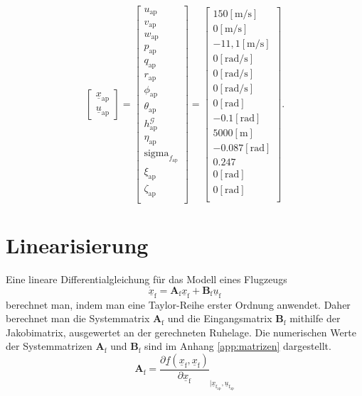 \begin{equation}
\begin{bmatrix}
\underline{x}_\mathrm{ap} \\ \underline{u}_\mathrm{ap} 
\end{bmatrix} = 
\begin{bmatrix} 
u_\mathrm{ap}\\v_\mathrm{ap}\\w_\mathrm{ap}\\p_\mathrm{ap}\\q_\mathrm{ap}\\r_\mathrm{ap}\\\phi_\mathrm{ap}\\\theta_\mathrm{ap}\\h^\mathcal{G}_\mathrm{ap}\\ \eta_\mathrm{ap}\\\mathrm{sigma}_{f_\mathrm{ap}}\\ \xi_\mathrm{ap} \\ \zeta_\mathrm{ap}\\
\end{bmatrix} =  \begin{bmatrix} 
150 \mathrm{ [m/s]}\\0 \mathrm{[ m/s]}\\-11,1 \mathrm{[m/s]}\\0 \mathrm{[ rad/s]}\\0 \mathrm{ [rad/s]}\\0 \mathrm{ [rad/s]}\\0 \mathrm{ [rad]}\\-0.1 \mathrm{[ rad]}\\5000 \mathrm{[ m]}\\-0.087 \mathrm{[ rad]}\\0.247 \\0 \mathrm{[ rad]}\\0 \mathrm{[ rad]}\\
\end{bmatrix}.
\end{equation}


\section{Linearisierung}
Eine lineare Differentialgleichung für das Modell eines Flugzeugs
\begin{equation}
\underline{\dot{x}}_\mathrm{f} = \textbf{A}_\mathrm{f}\underline{x}_\mathrm{f} + \textbf{B}_\mathrm{f}\underline{u}_\mathrm{f}
\end{equation}
berechnet man, indem man eine Taylor-Reihe erster Ordnung anwendet. Daher berechnet man die Systemmatrix $\textbf{A}_\mathrm{f}$ und die Eingangsmatrix $\textbf{B}_\mathrm{f}$ mithilfe der Jakobimatrix, ausgewertet an der gerechneten Ruhelage. Die numerischen Werte der Systemmatrizen $\textbf{A}_\mathrm{f}$ und $\textbf{B}_\mathrm{f}$ sind im Anhang \ref{app:matrizen} dargestellt.
\begin{equation}
\textbf{A}_\mathrm{f} = \dfrac{\partial \underline{f}(\underline{x}_\mathrm{f},\underline{x}_\mathrm{f})}{\partial \underline{x}_\mathrm{f}}_{|\underline{x}_\mathrm{f_{ap}},\underline{u}_\mathrm{f_{ap}}} 
\end{equation}


